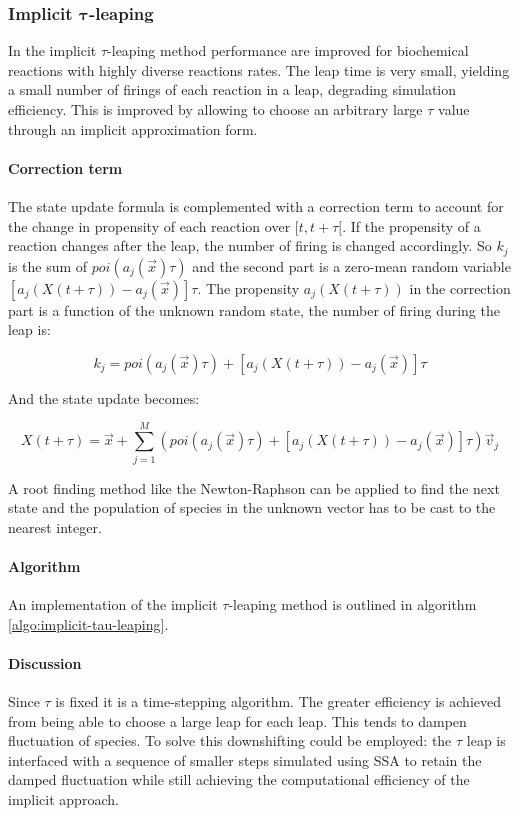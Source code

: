     \subsubsection{Implicit $\mathbf{\tau}$-leaping}
    In the implicit $\tau$-leaping method performance are improved for biochemical reactions with highly diverse reactions rates.
    The leap time is very small, yielding a small number of firings of each reaction in a leap, degrading simulation efficiency.
    This is improved by allowing to choose an arbitrary large $\tau$ value through an implicit approximation form.

      \paragraph{Correction term}
      The state update formula is complemented with a correction term to account for the change in propensity of each reaction over $[t,t+\tau[$.
      If the propensity of a reaction changes after the leap, the number of firing is changed accordingly.
      So $k_j$ is the sum of $poi(a_j(\vec{x})\tau)$ and the second part is a zero-mean random variable $[a_j(X(t+\tau))-a_j(\vec{x})]\tau$.
      The propensity $a_j(X(t+\tau))$ in the correction part is a function of the unknown random state, the number of firing during the leap is:

      $$k_j = poi(a_j(\vec{x})\tau) + [a_j(X(t+\tau))-a_j(\vec{x})]\tau$$

      And the state update becomes:

      $$X(t+\tau) = \vec{x} + \sum\limits_{j=1}^M\left(poi(a_j(\vec{x})\tau) + [a_j(X(t+\tau))-a_j(\vec{x})]\tau\right)\vec{v}_j$$

      A root finding method like the Newton-Raphson can be applied to find the next state and the population of species in the unknown vector has to be cast to the nearest integer.

      \paragraph{Algorithm}
      An implementation of the implicit $\tau$-leaping method is outlined in algorithm \ref{algo:implicit-tau-leaping}.

      

      \paragraph{Discussion}
      Since $\tau$ is fixed it is a time-stepping algorithm.
      The greater efficiency is achieved from being able to choose a large leap for each leap.
      This tends to dampen fluctuation of species.
      To solve this downshifting could be employed: the $\tau$ leap is interfaced with a sequence of smaller steps simulated using SSA to retain the damped fluctuation while still  achieving the computational efficiency of the implicit approach.

